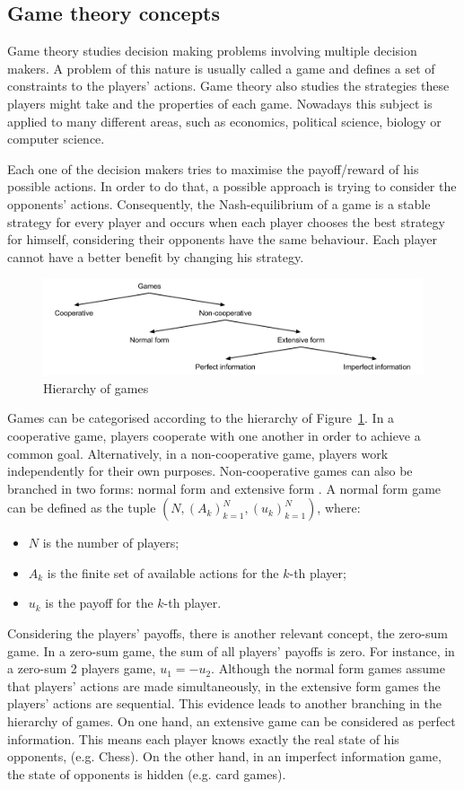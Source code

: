 \subsection{Game theory concepts}

Game theory studies decision making problems involving multiple decision makers.
A problem of this nature is usually called a game and defines a set of constraints to the players' actions.
Game theory also studies the strategies these players might take and the properties of each game.
Nowadays this subject is applied to many different areas, such as economics, political science, biology or computer science.

Each one of the decision makers tries to maximise the payoff/reward of his possible actions.
In order to do that, a possible approach is trying to consider the opponents' actions.
Consequently, the Nash-equilibrium of a game is a stable strategy for every player and occurs when each player chooses the best strategy for himself, considering their opponents have the same behaviour.
Each player cannot have a better benefit by changing his strategy.

\begin{figure}
\centering
\includegraphics[width=1\textwidth]{./img/gamesHierarchy}
\caption{Hierarchy of games}
\label{fig:games}
\end{figure}

Games can be categorised according to the hierarchy of Figure~\ref{fig:games}.
In a cooperative game, players cooperate with one another in order to achieve a common goal.
Alternatively, in a non-cooperative game, players work independently for their own purposes.
Non-cooperative games can also be branched in two forms: normal form and extensive form \cite{Shoham2010}.
A normal form game can be defined as the tuple $(N,(A_k)_{k=1}^{N},(u_k)_{k=1}^{N})$, where:
\begin{itemize}
\item $N$ is the number of players;
\item $A_k$ is the finite set of available actions for the $k$-th player;
\item $u_k$ is the payoff for the $k$-th player.
\end{itemize}
Considering the players' payoffs, there is another relevant concept, the zero-sum game.
In a zero-sum game, the sum of all players' payoffs is zero.
For instance, in a zero-sum 2 players game, $u_1 = -u_2$.
Although the normal form games assume that players' actions are made simultaneously, in the extensive form games the players' actions are sequential.
This evidence leads to another branching in the hierarchy of games.
On one hand, an extensive game can be considered as perfect information.
This means each player knows exactly the real state of his opponents, (e.g. Chess).
On the other hand, in an imperfect information game, the state of opponents is hidden (e.g. card games).

